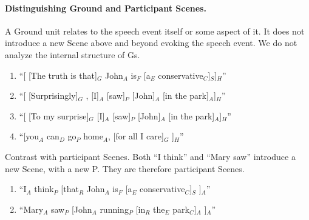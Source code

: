 \documentclass[11pt]{article}
\newcommand{\be}{\begin{enumerate}}
\newcommand{\ee}{\end{enumerate}}
\newcommand{\orig}[1]{{\color{red} {#1}}}
\begin{document}
\paragraph{Distinguishing Ground and Participant Scenes.}
A Ground unit relates to the speech event itself or some aspect of it. 
It does not introduce a new Scene above and beyond evoking the speech event.
We do not analyze the internal structure of Gs.
\be
\item
``[ [The truth is that]$_G$ John$_A$ is$_F$ [a$_E$ conservative$_C$]$_S$]$_H$''
\item
``[ [Surprisingly]$_G$ , [I]$_A$ [saw]$_P$ [John]$_A$ [in the park]$_A$]$_H$''
\item
``[ [To my surprise]$_G$ [I]$_A$ [saw]$_P$ [John]$_A$ [in the park]$_A$]$_H$''
\item
``[you$_A$ can$_D$ go$_P$ home$_A$, [for all I care]$_G$ ]$_H$''
\ee
Contrast with participant Scenes. Both ``I think'' and ``Mary saw'' introduce a new Scene, with a new P. They are therefore participant Scenes.
\be \item
``I$_A$ think$_P$ [that$_R$ John$_A$ is$_F$ [a$_E$ conservative$_C$]$_S$ ]$_A$''
\item
``Mary$_A$ saw$_P$ [John$_A$ running$_P$ [in$_R$ the$_E$ park$_C$]$_A$ ]$_A$''
\ee
\end{document}
